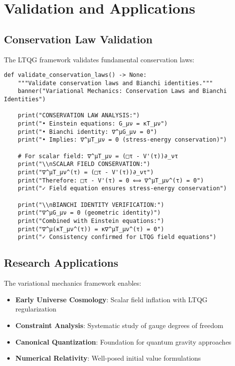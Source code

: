\documentclass[11pt,a4paper]{article}
\theoremstyle{definition}
\theoremstyle{remark}
\begin{document}
\section{Validation and Applications}

\subsection{Conservation Law Validation}

The LTQG framework validates fundamental conservation laws:

\begin{lstlisting}
def validate_conservation_laws() -> None:
    """Validate conservation laws and Bianchi identities."""
    banner("Variational Mechanics: Conservation Laws and Bianchi Identities")
    
    print("CONSERVATION LAW ANALYSIS:")
    print("• Einstein equations: G_μν = κT_μν")
    print("• Bianchi identity: ∇^μG_μν = 0")
    print("• Implies: ∇^μT_μν = 0 (stress-energy conservation)")
    
    # For scalar field: ∇^μT_μν = (□τ - V'(τ))∂_ντ
    print("\\nSCALAR FIELD CONSERVATION:")
    print("∇^μT_μν^(τ) = (□τ - V'(τ))∂_ντ")
    print("Therefore: □τ - V'(τ) = 0 ⟺ ∇^μT_μν^(τ) = 0")
    print("✓ Field equation ensures stress-energy conservation")
    
    print("\\nBIANCHI IDENTITY VERIFICATION:")
    print("∇^μG_μν = 0 (geometric identity)")
    print("Combined with Einstein equations:")
    print("∇^μ(κT_μν^(τ)) = κ∇^μT_μν^(τ) = 0")
    print("✓ Consistency confirmed for LTQG field equations")
\end{lstlisting}

\subsection{Research Applications}

The variational mechanics framework enables:

\begin{itemize}
\item \textbf{Early Universe Cosmology}: Scalar field inflation with LTQG regularization
\item \textbf{Constraint Analysis}: Systematic study of gauge degrees of freedom
\item \textbf{Canonical Quantization}: Foundation for quantum gravity approaches
\item \textbf{Numerical Relativity}: Well-posed initial value formulations
\end{itemize}
\end{document}

